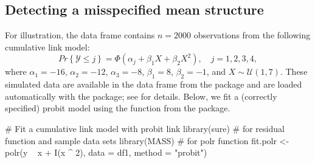 \subsection{Detecting a misspecified mean structure}

For illustration, the data frame  contains $n = 2000$ observations from the following cumulative link model:
\begin{equation}
\label{eqn:quadratic}
  Pr\left\{\mathcal{Y} \le j\right\} = \Phi\left(\alpha_j + \beta_1 X + \beta_2 X ^ 2\right), \quad j = 1, 2, 3, 4,
\end{equation}
where $\alpha_1 = -16$, $\alpha_2 = -12$, $\alpha_3 = -8$, $\beta_1 = 8$, $\beta_2 = -1$, and $X \sim \mathcal{U}\left(1, 7\right)$. These simulated data are available in the  data frame from the  package and are loaded automatically with the package; see  for details. Below, we fit a (correctly specified) probit model using the  function from the  package.
\begin{example}
# Fit a cumulative link model with probit link
library(sure)  # for residual function and sample data sets
library(MASS)  # for polr function
fit.polr <- polr(y ~ x + I(x ^ 2), data = df1, method = "probit")
\end{example}

